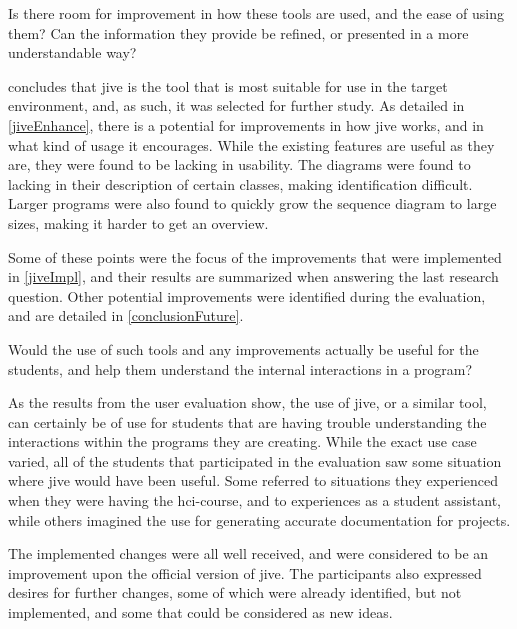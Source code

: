 \begin{theorem}
Is there room for improvement in how these tools are used, and the ease of using them? Can the information they provide be refined, or presented in a more understandable way?
\end{theorem}

 concludes that \gls{jive} is the tool that is most suitable for use in the target environment, and, as such, it was selected for further study.
As detailed in \cref{jiveEnhance}, there is a potential for improvements in how \gls{jive} works, and in what kind of usage it encourages.
While the existing features are useful as they are, they were found to be lacking in usability.
The diagrams were found to lacking in their description of certain classes, making identification difficult.
Larger programs were also found to quickly grow the sequence diagram to large sizes, making it harder to get an overview.


Some of these points were the focus of the improvements that were implemented in \cref{jiveImpl}, and their results are summarized when answering the last research question.
Other potential improvements were identified during the evaluation, and are detailed in \cref{conclusionFuture}.


\begin{theorem}
Would the use of such tools and any improvements actually be useful for the students, and help them understand the internal interactions in a program?
\end{theorem}

As the results from the user evaluation show, the use of \gls{jive}, or a similar tool, can certainly be of use for students that are having trouble understanding the interactions within the programs they are creating.
While the exact use case varied, all of the students that participated in the evaluation saw some situation where \gls{jive} would have been useful.
Some referred to situations they experienced when they were having the \gls{hci}-course, and to experiences as a student assistant, while others imagined the use for generating accurate documentation for projects.


The implemented changes were all well received, and were considered to be an improvement upon the official version of \gls{jive}.
The participants also expressed desires for further changes, some of which were already identified, but not implemented, and some that could be considered as new ideas.



